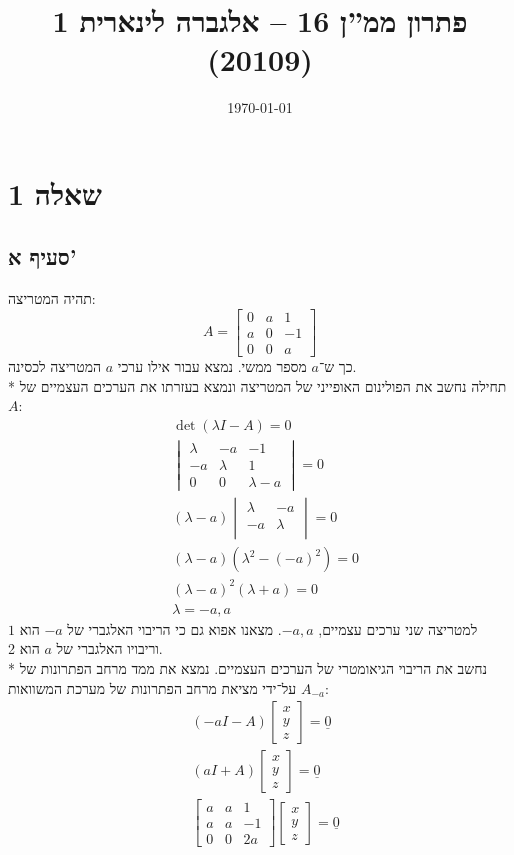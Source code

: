 \documentclass[a4paper,10pt]{article}
\title{פתרון ממ''ן 16 – אלגברה לינארית 1 (20109)}
\author{\AUTHOR}
\date\today
\begin{document}
\maketitle
\section{שאלה 1}
\subsection{סעיף א'}
תהיה המטריצה:
\[
	A =
	\begin{bmatrix}
		0 & a & 1 \\
		a & 0 & -1 \\
		0 & 0 & a
	\end{bmatrix}
\]
כך ש־$a$ מספר ממשי. נמצא עבור אילו ערכי $a$ המטריצה לכסינה. \\*
תחילה נחשב את הפולינום האופייני של המטריצה ונמצא בעזרתו
את הערכים העצמיים של $A$:
\begin{align*}
	& \det(\lambda I - A) = 0 \\
	& \begin{vmatrix}
		\lambda & -a & -1 \\
		-a & \lambda & 1 \\
		0 & 0 & \lambda - a
	\end{vmatrix} = 0 \\
	& (\lambda - a) \begin{vmatrix}
		\lambda & -a \\
		-a & \lambda \\
	\end{vmatrix} = 0 \\
	& (\lambda - a) (\lambda^2 - {(-a)}^2) = 0 \\
	& {(\lambda - a)}^2 (\lambda + a) = 0 \\
	& \lambda = -a, a
\end{align*}
למטריצה שני ערכים עצמיים, $-a, a$.
מצאנו אפוא גם כי הריבוי האלגברי של $-a$ הוא $1$
וריבויו האלגברי של $a$ הוא 2. \\*
נחשב את הריבוי הגיאומטרי של הערכים העצמיים.
נמצא את ממד מרחב הפתרונות של $A_{-a}$ על־ידי מציאת מרחב הפתרונות של מערכת המשוואות:
\begin{align*}
	& (-aI - A) \begin{bmatrix} x \\ y \\ z \end{bmatrix} = \underline{0} \\
	& (aI + A) \begin{bmatrix} x \\ y \\ z \end{bmatrix} = \underline{0} \\
	& \begin{bmatrix}
		a & a & 1 \\
		a & a & -1 \\
		0 & 0 & 2a
	\end{bmatrix}
	\begin{bmatrix} x \\ y \\ z \end{bmatrix} = \underline{0} \\
\end{align*}
\end{document}

